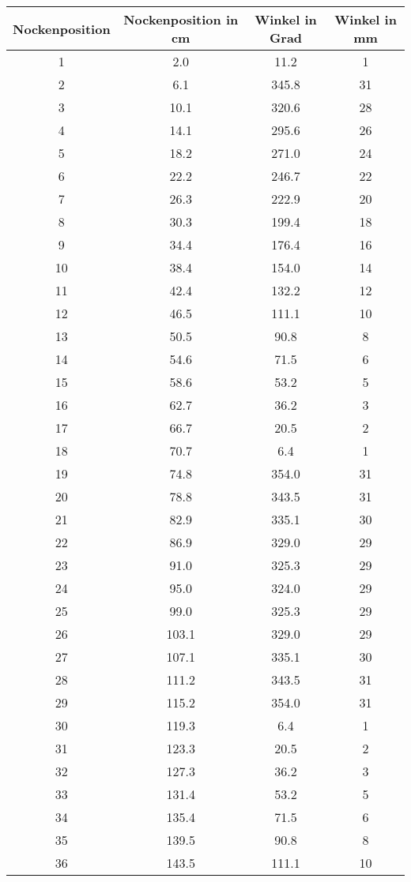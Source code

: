 \documentclass[10pt, a4paper]{article}
\begin{document}
\begin{center}
	\begin{tabular}{c|c|c|c}
		Nockenposition & Nockenposition in cm & Winkel in Grad & Winkel in mm \\
		\hline
		1 & 2.0 & 11.2 & 1 \\
		2 & 6.1 & 345.8 & 31 \\
		3 & 10.1 & 320.6 & 28 \\
		4 & 14.1 & 295.6 & 26 \\
		5 & 18.2 & 271.0 & 24 \\
		6 & 22.2 & 246.7 & 22 \\
		7 & 26.3 & 222.9 & 20 \\
		8 & 30.3 & 199.4 & 18 \\
		9 & 34.4 & 176.4 & 16 \\
		10 & 38.4 & 154.0 & 14 \\
		11 & 42.4 & 132.2 & 12 \\
		12 & 46.5 & 111.1 & 10 \\
		13 & 50.5 & 90.8 & 8 \\
		14 & 54.6 & 71.5 & 6 \\
		15 & 58.6 & 53.2 & 5 \\
		16 & 62.7 & 36.2 & 3 \\
		17 & 66.7 & 20.5 & 2 \\
		18 & 70.7 & 6.4 & 1 \\
		19 & 74.8 & 354.0 & 31 \\
		20 & 78.8 & 343.5 & 31 \\
		21 & 82.9 & 335.1 & 30 \\
		22 & 86.9 & 329.0 & 29 \\
		23 & 91.0 & 325.3 & 29 \\
		24 & 95.0 & 324.0 & 29 \\
		25 & 99.0 & 325.3 & 29 \\
		26 & 103.1 & 329.0 & 29 \\
		27 & 107.1 & 335.1 & 30 \\
		28 & 111.2 & 343.5 & 31 \\
		29 & 115.2 & 354.0 & 31 \\
		30 & 119.3 & 6.4 & 1 \\
		31 & 123.3 & 20.5 & 2 \\
		32 & 127.3 & 36.2 & 3 \\
		33 & 131.4 & 53.2 & 5 \\
		34 & 135.4 & 71.5 & 6 \\
		35 & 139.5 & 90.8 & 8 \\
		36 & 143.5 & 111.1 & 10 \\

\end{tabular}
\end{center}
\end{document}
